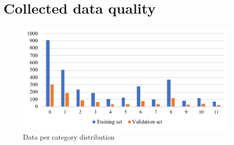 \section{Collected data quality}
\label{sec:Collected data quality}

\begin{figure}[!ht]
    \centering
    \includegraphics[width=\textwidth]{evaluation/imgs/5-data-dist-diag.pdf}
    \caption{Data per category distribution}
    \label{fig:5-data-dist-diag}
\end{figure}